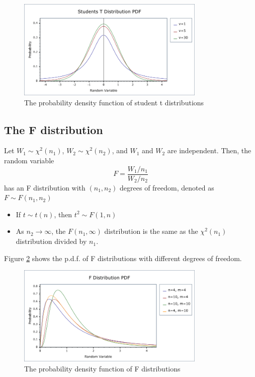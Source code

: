 \documentclass[a4paper,11pt]{article}
\begin{document}
\begin{figure}[htbp]
\centering
\includegraphics[width=0.8\textwidth]{figure/students_t_pdf.png}
\caption{\label{fig:org63dd02a}
The probability density function of student t distributions}
\end{figure}


\subsection{The F distribution}
\label{sec:org091bf3b}

Let \(W_1 \sim \chi^2(n_1)\), \(W_2 \sim \chi^2(n_2)\), and \(W_1\) and
\(W_2\) are independent. Then, the random variable
\[ F = \frac{W_1/n_1}{W_2/n_2}\]
has an F distribution with \((n_1, n_2)\) degrees of freedom, denoted as
\(F \sim F(n_1, n_2)\)

\begin{itemize}
\item If \(t \sim t(n)\), then \(t^2 \sim F(1, n)\)
\item As \(n_2 \rightarrow \infty\), the \(F(n_1, \infty)\) distribution is the
same as the \(\chi^2(n_1)\) distribution divided by \(n_1\).
\end{itemize}

Figure \ref{fig:org32cbc4c} shows the p.d.f. of F distributions
with different degrees of freedom. 

\begin{figure}[htbp]
\centering
\includegraphics[width=0.8\textwidth]{figure/fisher_f_pdf.png}
\caption{\label{fig:org32cbc4c}
The probability density function of F distributions}
\end{figure}
\end{document}

